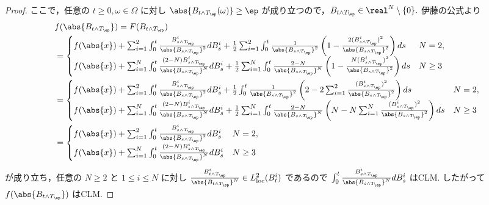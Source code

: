\documentclass{jsarticle}
\begin{document}
\begin{enumerate}
\begin{proof}
        ここで，任意の $t\ge0,\omega\in\Omega$ に対し $\abs{B_{t\wedge T_\ep}(\omega)}\ge\ep$ が成り立つので，$B_{t\wedge T_\ep}\in\real^N\setminus\{0\}.$
        伊藤の公式より
        \begin{align}
            & f(\abs{B_{t\wedge T_\ep}})
            = F(B_{t\wedge T_\ep}) \\
            &= 
            \begin{cases}
                f(\abs{x})
                + \sum_{i=1}^{2}\int_0^t\frac{B_{s\wedge T_\ep}^i}{\abs{B_{s\wedge T_\ep}}^2}dB_s^i
                + \frac{1}{2}\sum_{i=1}^{2}\int_0^t\frac{1}{\abs{B_{s\wedge T_\ep}}^2}\left(1-\frac{2(B_{s\wedge T_\ep}^i)^2}{\abs{B_{s\wedge T_\ep}}^2}\right)ds & N=2, \\
                f(\abs{x})
                + \sum_{i=1}^{N}\int_0^t\frac{(2-N)B_{s\wedge T_\ep}^i}{\abs{B_{s\wedge T_\ep}}^N}dB_s^i
                + \frac{1}{2}\sum_{i=1}^{N}\int_0^t\frac{2-N}{\abs{B_{s\wedge T_\ep}}^N}\left(1-\frac{N(B_{s\wedge T_\ep}^i)^2}{\abs{B_{s\wedge T_\ep}}^2}\right)ds & N\ge3
            \end{cases} \\
            &= 
            \begin{cases}
                f(\abs{x})
                + \sum_{i=1}^{2}\int_0^t\frac{B_{s\wedge T_\ep}^i}{\abs{B_{s\wedge T_\ep}}^2}dB_s^i
                + \frac{1}{2}\int_0^t\frac{1}{\abs{B_{s\wedge T_\ep}}^2}\left(2-2\sum_{i=1}^{2}\frac{(B_{s\wedge T_\ep}^i)^2}{\abs{B_{s\wedge T_\ep}}^2}\right)ds & N=2, \\
                f(\abs{x})
                + \sum_{i=1}^{N}\int_0^t\frac{(2-N)B_{s\wedge T_\ep}^i}{\abs{B_{s\wedge T_\ep}}^N}dB_s^i
                + \frac{1}{2}\sum_{i=1}^{N}\int_0^t\frac{2-N}{\abs{B_{s\wedge T_\ep}}^N}\left(N-N\sum_{i=1}^{N}\frac{(B_{s\wedge T_\ep}^i)^2}{\abs{B_{s\wedge T_\ep}}^2}\right)ds & N\ge3
            \end{cases} \\
            &= 
            \begin{cases}
                f(\abs{x})
                + \sum_{i=1}^{2}\int_0^t\frac{B_{s\wedge T_\ep}^i}{\abs{B_{s\wedge T_\ep}}^2}dB_s^i & N=2, \\
                f(\abs{x})
                + \sum_{i=1}^{N}\int_0^t\frac{(2-N)B_{s\wedge T_\ep}^i}{\abs{B_{s\wedge T_\ep}}^N}dB_s^i & N\ge3
            \end{cases}
        \end{align}
        が成り立ち，任意の $N\ge2$ と $1\le i\le N$ に対し $\frac{B_{t\wedge T_\ep}^i}{\abs{B_{t\wedge T_\ep}}^N}\in L_{\mathrm{loc}}^2(B_t^i)$ であるので $\int_0^t\frac{B_{s\wedge T_\ep}^i}{\abs{B_{s\wedge T_\ep}}^N}dB_s^i$ はCLM.
        したがって $f(\abs{B_{t\wedge T_\ep}})$ はCLM.
    \end{proof}
    

\end{enumerate}
\end{document}
